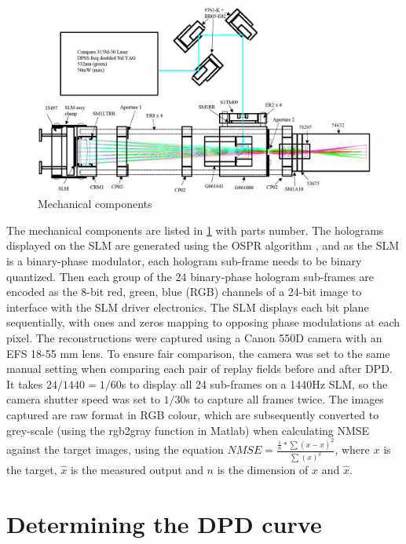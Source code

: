 \begin{figure}[H]
    \centering
    \includegraphics[width=\textwidth]{holographic_projector.png}
    \caption{Mechanical components \cite{Freeman2009}}
    \label{fig:holographic_projector}
\end{figure}

The mechanical components are listed in \cref{fig:holographic_projector} with parts number. The holograms displayed on the SLM are generated using the OSPR algorithm \cite{Cable2004}, and as the SLM is a binary-phase modulator, each hologram sub-frame needs to be binary quantized. Then each group of the 24 binary-phase hologram sub-frames are encoded as the 8-bit red, green, blue (RGB) channels of a 24-bit image to interface with the SLM driver electronics. The SLM displays each bit plane sequentially, with ones and zeros mapping to opposing phase modulations at each pixel. The reconstructions were captured using a Canon 550D camera with an EFS 18-55 mm lens. To ensure fair comparison, the camera was set to the same manual setting when comparing each pair of replay fields before and after DPD. It takes $24/1440=1/60$s to display all 24 sub-frames on a 1440Hz SLM, so the camera shutter speed was set to $1/30$s to capture all frames twice. The images captured are raw format in RGB colour, which are subsequently converted to grey-scale (using the rgb2gray function in Matlab\cite{MATLAB}) when calculating NMSE against the target images, using the equation $NMSE = \frac{\frac{1}{n} * \sum (x - \hat{x})^2}{\sum (x)^2}$, where $x$ is the target, $\hat{x}$ is the measured output and $n$ is the dimension of $x$ and $\hat{x}$.



\section{Determining the DPD curve}

